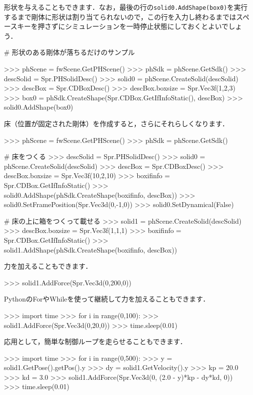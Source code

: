 \KLUDGE 形状を与えることもできます．なお，最後の行の\texttt{solid0.AddShape(box0)}を実行するまで剛体に形状は割り当てられないので，この行を入力し終わるまではスペースキーを押さずにシミュレーションを一時停止状態にしておくとよいでしょう．
\begin{sourcecode}
# 形状のある剛体が落ちるだけのサンプル

\KLUDGE >>> phScene = fwScene.GetPHScene()
\KLUDGE >>> phSdk   = phScene.GetSdk()
\KLUDGE >>> descSolid = Spr.PHSolidDesc()
\KLUDGE >>> solid0 = phScene.CreateSolid(descSolid)
\KLUDGE >>> descBox = Spr.CDBoxDesc()
\KLUDGE >>> descBox.boxsize = Spr.Vec3f(1,2,3)
\KLUDGE >>> box0 = phSdk.CreateShape(Spr.CDBox.GetIfInfoStatic(), descBox)
\KLUDGE >>> solid0.AddShape(box0)
\end{sourcecode}

\KLUDGE 床（位置が固定された剛体）を作成すると，さらにそれらしくなります．
\begin{sourcecode}
\KLUDGE >>> phScene = fwScene.GetPHScene()
\KLUDGE >>> phSdk   = phScene.GetSdk()

# 床をつくる
\KLUDGE >>> descSolid = Spr.PHSolidDesc()
\KLUDGE >>> solid0 = phScene.CreateSolid(descSolid)
\KLUDGE >>> descBox = Spr.CDBoxDesc()
\KLUDGE >>> descBox.boxsize = Spr.Vec3f(10,2,10)
\KLUDGE >>> boxifinfo = Spr.CDBox.GetIfInfoStatic()
\KLUDGE >>> solid0.AddShape(phSdk.CreateShape(boxifinfo, descBox))
\KLUDGE >>> solid0.SetFramePosition(Spr.Vec3d(0,-1,0))
\KLUDGE >>> solid0.SetDynamical(False)

# 床の上に箱をつくって載せる
\KLUDGE >>> solid1 = phScene.CreateSolid(descSolid)
\KLUDGE >>> descBox.boxsize = Spr.Vec3f(1,1,1)
\KLUDGE >>> boxifinfo = Spr.CDBox.GetIfInfoStatic()
\KLUDGE >>> solid1.AddShape(phSdk.CreateShape(boxifinfo, descBox))
\end{sourcecode}

\KLUDGE 力を加えることもできます．
\begin{sourcecode}
\KLUDGE >>> solid1.AddForce(Spr.Vec3d(0,200,0))
\end{sourcecode}

PythonのForやWhileを使って継続して力を加えることもできます．
\begin{sourcecode}
\KLUDGE >>> import time
\KLUDGE >>> for i in range(0,100):
\KLUDGE >>>     solid1.AddForce(Spr.Vec3d(0,20,0))
\KLUDGE >>>     time.sleep(0.01)
\end{sourcecode}

\KLUDGE 応用として，簡単な制御ループを走らせることもできます．
\begin{sourcecode}
\KLUDGE >>> import time
\KLUDGE >>> for i in range(0,500):
\KLUDGE >>>   y  = solid1.GetPose().getPos().y
\KLUDGE >>>   dy = solid1.GetVelocity().y
\KLUDGE >>>   kp = 20.0
\KLUDGE >>>   kd =  3.0
\KLUDGE >>>   solid1.AddForce(Spr.Vec3d(0, (2.0 - y)*kp - dy*kd, 0))
\KLUDGE >>>   time.sleep(0.01)
\end{sourcecode}

